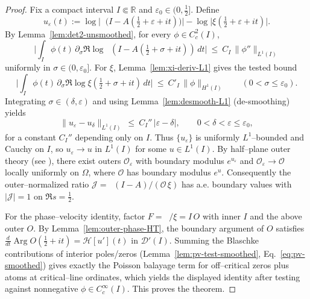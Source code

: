 \documentclass[11pt]{article}
\newcommand{\Hilb}{\mathcal H}
\theoremstyle{definition}
\theoremstyle{remark}
\newcommand{\R}{\mathbb{R}}
\DeclareMathOperator{\dettwo}{det_2}
\DeclareMathOperator{\Arg}{Arg}
\begin{document}
\begin{proof}
Fix a compact interval $I\Subset\R$ and $\varepsilon_0\in(0,\tfrac12]$. Define
\[
 u_\varepsilon(t):=\log\Big|\dettwo\big(I-A(\tfrac12+\varepsilon+it)\big)\Big|-\log\Big|\xi(\tfrac12+\varepsilon+it)\Big|.
\]
By Lemma~\ref{lem:det2-unsmoothed}, for every $\phi\in C_c^2(I)$,
\[
 \Big|\!\int_I \!\phi(t)\,\partial_\sigma\Re\log\dettwo(I\! -\!A(\tfrac12\!+\!\sigma\!+\!it))\,dt\Big|\ \le\ C_I\,\|\phi''\|_{L^1(I)}
\]
uniformly in $\sigma\in(0,\varepsilon_0]$. For $\xi$, Lemma~\ref{lem:xi-deriv-L1} gives the tested bound
\[
 \Big|\int_I \phi(t)\,\partial_\sigma\Re\log\xi(\tfrac12+\sigma+it)\,dt\Big|\ \le\ C'_I\,\|\phi\|_{H^1(I)}\qquad(0<\sigma\le \varepsilon_0).
\]
Integrating $\sigma\in(\delta,\varepsilon)$ and using Lemma~\ref{lem:desmooth-L1} (de-smoothing) yields
\[
 \|u_\varepsilon-u_\delta\|_{L^1(I)}\ \le\ C_I''\,|\varepsilon-\delta|,\qquad 0<\delta<\varepsilon\le\varepsilon_0,
\]
for a constant $C_I''$ depending only on $I$.
Thus $\{u_\varepsilon\}$ is uniformly $L^1$–bounded and Cauchy on $I$, so $u_\varepsilon\to u$ in $L^1(I)$ for some $u\in L^1(I)$. By half–plane outer theory (see \cite{Garnett,RosenblumRovnyak}), there exist outers $\mathcal O_\varepsilon$ with boundary modulus $e^{u_\varepsilon}$ and $\mathcal O_\varepsilon\to\mathcal O$ locally uniformly on $\Omega$, where $\mathcal O$ has boundary modulus $e^{u}$. Consequently the outer–normalized ratio $\mathcal J=\dettwo(I-A)/(\mathcal O\,\xi)$ has a.e. boundary values with $|\mathcal J|=1$ on $\Re s=\tfrac12$.

For the phase–velocity identity, factor $F=\dettwo/\xi=I\,O$ with inner $I$ and the above outer $O$. By Lemma~\ref{lem:outer-phase-HT}, the boundary argument of $O$ satisfies $\frac{d}{dt}\Arg O(\tfrac12+it)=\Hilb[u'](t)$ in $\mathcal D'(I)$. Summing the Blaschke contributions of interior poles/zeros (Lemma~\ref{lem:pv-test-smoothed}, Eq.~\eqref{eq:pv-smoothed}) gives exactly the Poisson balayage term for off–critical zeros plus atoms at critical–line ordinates, which yields the displayed identity after testing against nonnegative $\phi\in C_c^\infty(I)$. This proves the theorem.
\end{proof}
\end{document}
